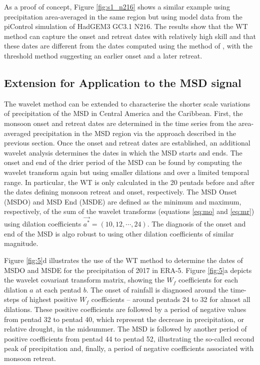  As a proof of concept, Figure \ref{fig:s1_n216} shows a similar example using precipitation area-averaged in the same region but using model data from the piControl simulation of HadGEM3 GC3.1 N216. 
 The results show that the WT method can capture the onset and retreat dates with relatively high skill and that these dates are different from the dates computed using the method of , with the threshold method suggesting an earlier onset and a later retreat. 

\subsection{Extension for Application to the MSD signal}




The wavelet method can be extended to characterise the shorter scale variations of precipitation of the MSD in Central America and the Caribbean. First, the monsoon onset and retreat dates are determined in the time series from the area-averaged precipitation in the MSD region via the approach described in the previous section. 
Once the onset and retreat dates are established, an additional wavelet analysis determines the dates in which the MSD starts and ends.
The onset and end of the drier period of the MSD can be found by computing the wavelet transform again but using smaller dilations and over a limited temporal range. In particular, the WT is only calculated in the 20 pentads before and after the dates defining monsoon retreat and onset, respectively. The MSD Onset (MSDO) and MSD End (MSDE) are defined as the minimum and maximum, respectively, of the sum of the wavelet transforms (equations \ref{eq:mo} and \ref{eq:mr}) using dilation coefficients $\vec{a^*} = (10,12,\cdots, 24)$.
The diagnosis of the onset and end of the MSD is algo robust to using other dilation coefficients of similar magnitude.

Figure \ref{fig:5}d illustrates the use of the WT method to determine the dates of MSDO and MSDE for the precipitation of 2017 in ERA-5.
Figure \ref{fig:5}a depicts the wavelet covariant transform matrix, showing the $W_f$ coefficients for each dilation $a$ at each pentad $b$. The onset of rainfall is diagnosed around the time-steps of highest positive $W_f$ coefficients -- around pentads 24 to 32 for almost all dilations. These positive coefficients are followed by a period of negative values from pentad 32 to pentad 40, which represent the decrease in precipitation, or relative drought, in the midsummer. The MSD is followed by another period of positive coefficients from pentad 44 to pentad 52, illustrating the so-called second peak of precipitation and, finally, a period of negative coefficients associated with monsoon retreat.


